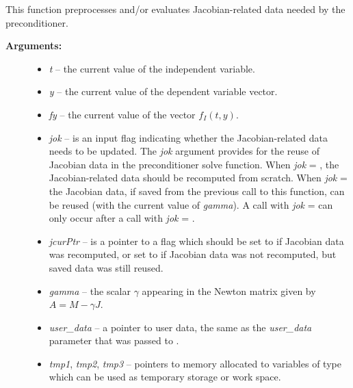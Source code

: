 \documentclass[letterpaper,10pt,english]{sphinxmanual}
\begin{document}
\begin{fulllineitems}
\label{c_interface/User_supplied:c.ARKSpilsPrecSetupFn}
This function preprocesses and/or evaluates Jacobian-related
data needed by the preconditioner.
\begin{description}
\item[{\textbf{Arguments:}}] \leavevmode\begin{itemize}
\item {} 
\emph{t} -- the current value of the independent variable.

\item {} 
\emph{y} -- the current value of the dependent variable vector.

\item {} 
\emph{fy} -- the current value of the vector \(f_I(t,y)\).

\item {} 
\emph{jok} -- is an input flag indicating whether the Jacobian-related
data needs to be updated. The \emph{jok} argument provides for the
reuse of Jacobian data in the preconditioner solve function. When
\emph{jok} = , the Jacobian-related data should be recomputed
from scratch. When \emph{jok} =  the Jacobian data, if saved from the
previous call to this function, can be reused (with the current
value of \emph{gamma}). A call with \emph{jok} =  can only occur
after a call with \emph{jok} = .

\item {} 
\emph{jcurPtr} -- is a pointer to a flag which should be set to
 if Jacobian data was recomputed, or set to  if
Jacobian data was not recomputed, but saved data was still reused.

\item {} 
\emph{gamma} -- the scalar \(\gamma\) appearing in the Newton
matrix given by \(A=M-\gamma J\).

\item {} 
\emph{user\_data} -- a pointer to user data, the same as the
\emph{user\_data} parameter that was passed to {\hyperref[c_interface/User_callable:c.ARKodeSetUserData]{\emph{}}}.

\item {} 
\emph{tmp1}, \emph{tmp2}, \emph{tmp3} -- pointers to memory allocated to
variables of type  which can be used as temporary
storage or work space.


\end{itemize}
\end{description}
\end{fulllineitems}
\end{document}
